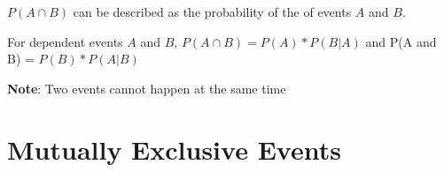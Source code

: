 \begin{definition}
    $P(A \cap B)$ can be described as the probability of the  of events $A$ and $B$.
\end{definition}

\begin{definition}
    For dependent events $A$ and $B$, $P(A \cap B) = P(A) * P(B | A)$ and P(A and B) = $P(B) * P(A|B)$
\end{definition}

\begin{blueblock}
    \textbf{Note}: Two events cannot happen at the same time
\end{blueblock}

\section{Mutually Exclusive Events}
